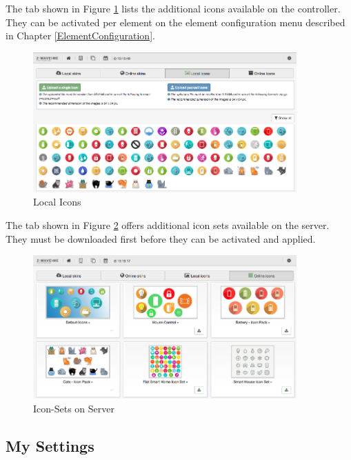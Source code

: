 The tab shown in Figure \ref{shui83} lists the additional icons available on the controller. 
They can be activated per element on the element configuration menu described in 
Chapter \ref{ElementConfiguration}.


\begin{figure}
\begin{center}
\includegraphics[width=0.9\textwidth]{pngs/cap4/shui83.png}
\caption{Local Icons}
\label{shui83}
\end{center}
\end{figure}

The tab shown in Figure \ref{shui84} offers additional icon sets available on the server. 
They must be downloaded first before they can be activated and applied.

\begin{figure}
\begin{center}
\includegraphics[width=0.9\textwidth]{pngs/cap4/shui84.png}
\caption{Icon-Sets on Server}
\label{shui84}
\end{center}
\end{figure}

\subsection{My Settings}
\label{mysettings}

